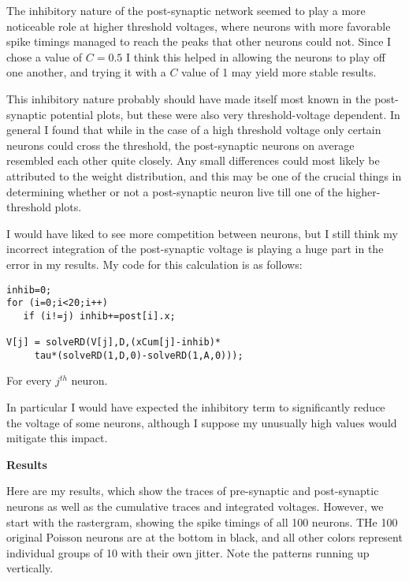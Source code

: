 \documentclass[a4paper,12pt]{article}
\begin{document}
\vspace{2mm}


The inhibitory nature of the post-synaptic network seemed to play a more noticeable role at higher threshold voltages, where neurons with more favorable spike timings managed to reach the peaks that other neurons could not. Since I chose a value of $C=0.5$ I think this helped in allowing the neurons to play off one another, and trying it with a $C$ value of 1 may yield more stable results. 

\vspace{2mm}

This inhibitory nature probably should have made itself most known in the post-synaptic potential plots, but these were also very threshold-voltage dependent. In general I found that while in the case of a high threshold voltage only certain neurons could cross the threshold, the post-synaptic neurons on average resembled each other quite closely. Any small differences could most likely be attributed to the weight distribution, and this may be one of the crucial things in determining whether or not a post-synaptic neuron live till one of the higher-threshold plots. 

\vspace{2mm}

I would have liked to see more competition between neurons, but I still think my incorrect integration of the post-synaptic voltage is playing a huge part in the error in my results. My code for this calculation is as follows:

\begin{verbatim}
inhib=0;
for (i=0;i<20;i++)
   if (i!=j) inhib+=post[i].x;

V[j] = solveRD(V[j],D,(xCum[j]-inhib)*
     tau*(solveRD(1,D,0)-solveRD(1,A,0)));
\end{verbatim}

For every $j^{th}$ neuron. 

\vspace{2mm}

In particular I would have expected the inhibitory term to significantly reduce the voltage of some neurons, although I suppose my unusually high values would mitigate this impact. 

\vfil\eject 
{\bf Results}
\bigskip

Here are my results, which show the traces of pre-synaptic and post-synaptic neurons as well as the cumulative traces and integrated voltages. However, we start with the rastergram, showing the spike timings of all 100 neurons. THe 100 original Poisson neurons are at the bottom in black, and all other colors represent individual groups of 10 with their own jitter. Note the patterns running up vertically. 
\end{document}
